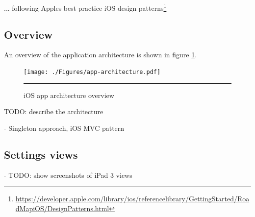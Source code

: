 ... following Apples best practice iOS design patterns\footnote{\url{https://developer.apple.com/library/ios/referencelibrary/GettingStarted/RoadMapiOS/DesignPatterns.html}}

\subsection{Overview}
An overview of the application architecture is shown in figure \ref{fig:apparchitecture}.

\begin{figure}[htbp]
	\centering
		\texttt{[image: ./Figures/app-architecture.pdf]}
		\rule{35em}{1pt}
	\caption[App architecture]{iOS app architecture overview}
	\label{fig:apparchitecture}
\end{figure}

TODO: describe the architecture

- Singleton approach, iOS MVC pattern

\subsection{Settings views}
- TODO: show screenshots of iPad 3 views








